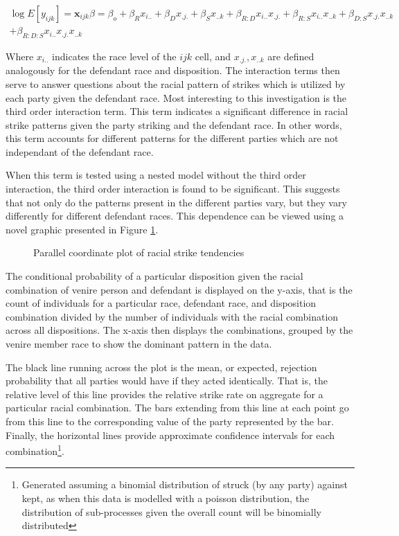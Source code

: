 \begin{multline}
  \log{E[y_{ijk}]} = \textbf{x}_{ijk}\beta = \beta_o + \beta_R x_{i..}  + \beta_{D} x_{.j.} + \beta_S x_{..k} +\beta_{R:D}x_{i..}
  x_{.j.} + \beta_{R:S} x_{i..} x_{..k} +\beta_{D:S} x_{.j.}x_{..k} \\+ \beta_{R:D:S} x_{i..} x_{.j.} x_{..k}
\end{multline}

Where $x_{i..}$ indicates the race level of the $ijk$ cell, and $x_{.j.},x_{..k}$ are defined analogously for the defendant race
and disposition. The interaction terms then serve to answer questions about the racial pattern of strikes which is utilized by
each party given the defendant race. Most interesting to this investigation is the third order interaction term. This term
indicates a significant difference in racial strike patterns given the party striking and the defendant race. In other words, this
term accounts for different patterns for the different parties which are not independant of the defendant race.

When this term is tested using a nested model without the third order interaction, the third order interaction is found to be
significant. This suggests that not only do the patterns present in the different parties vary, but they vary differently for
different defendant races. This dependence can be viewed using a novel graphic presented in Figure \ref{fig:raceraceparcoord}.

\begin{figure}[!h]
  \centering
  \caption[Strike Tendency by Racial Combination {Sunshine}]{Parallel coordinate plot of racial strike tendencies}
  \label{fig:raceraceparcoord}
\end{figure}

The conditional probability of a particular disposition given the racial combination of venire person and defendant is displayed
on the y-axis, that is the count of individuals for a particular race, defendant race, and disposition combination divided by the
number of individuals with the racial combination across all dispositions. The x-axis then displays the combinations, grouped by
the venire member race to show the dominant pattern in the data.

The black line running across the plot is the mean, or expected, rejection probability that all parties would have if they acted
identically. That is, the relative level of this line provides the relative strike rate on aggregate for a particular racial
combination. The bars extending from this line at each point go from this line to the corresponding value of the party represented
by the bar. Finally, the horizontal lines provide approximate confidence intervals for each combination\footnote{Generated
  assuming a binomial distribution of struck (by any party) against kept, as when this data is modelled with a poisson
  distribution, the distribution of sub-processes given the overall count will be binomially distributed}.

